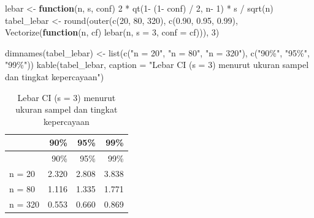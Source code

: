 \documentclass[
  indonesian,
  letterpaper,
]{book}
\newenvironment{Shaded}{\begin{snugshade}}{\end{snugshade}}
\newcommand{\AttributeTok}[1]{\textcolor[rgb]{0.40,0.45,0.13}{#1}}
\newcommand{\ControlFlowTok}[1]{\textcolor[rgb]{0.00,0.23,0.31}{\textbf{#1}}}
\newcommand{\DecValTok}[1]{\textcolor[rgb]{0.68,0.00,0.00}{#1}}
\newcommand{\FloatTok}[1]{\textcolor[rgb]{0.68,0.00,0.00}{#1}}
\newcommand{\FunctionTok}[1]{\textcolor[rgb]{0.28,0.35,0.67}{#1}}
\newcommand{\NormalTok}[1]{\textcolor[rgb]{0.00,0.23,0.31}{#1}}
\newcommand{\OtherTok}[1]{\textcolor[rgb]{0.00,0.23,0.31}{#1}}
\newcommand{\SpecialCharTok}[1]{\textcolor[rgb]{0.37,0.37,0.37}{#1}}
\newcommand{\StringTok}[1]{\textcolor[rgb]{0.13,0.47,0.30}{#1}}
\begin{document}
\begin{Shaded}
\begin{Highlighting}[]
\NormalTok{lebar }\OtherTok{\textless{}{-}} \ControlFlowTok{function}\NormalTok{(n, s, conf) }\DecValTok{2} \SpecialCharTok{*} \FunctionTok{qt}\NormalTok{(}\DecValTok{1}\SpecialCharTok{{-}}\NormalTok{ (}\DecValTok{1}\SpecialCharTok{{-}}\NormalTok{ conf) }\SpecialCharTok{/} \DecValTok{2}\NormalTok{, n}\SpecialCharTok{{-}} \DecValTok{1}\NormalTok{) }\SpecialCharTok{*}\NormalTok{ s }\SpecialCharTok{/} \FunctionTok{sqrt}\NormalTok{(n)}
\NormalTok{tabel\_lebar }\OtherTok{\textless{}{-}} \FunctionTok{round}\NormalTok{(}\FunctionTok{outer}\NormalTok{(}\FunctionTok{c}\NormalTok{(}\DecValTok{20}\NormalTok{, }\DecValTok{80}\NormalTok{, }\DecValTok{320}\NormalTok{), }\FunctionTok{c}\NormalTok{(}\FloatTok{0.90}\NormalTok{, }\FloatTok{0.95}\NormalTok{, }\FloatTok{0.99}\NormalTok{),}
\FunctionTok{Vectorize}\NormalTok{(}\ControlFlowTok{function}\NormalTok{(n, cf) }\FunctionTok{lebar}\NormalTok{(n, }\AttributeTok{s =} \DecValTok{3}\NormalTok{, }\AttributeTok{conf =}\NormalTok{ cf))),}
\DecValTok{3}\NormalTok{)}

\FunctionTok{dimnames}\NormalTok{(tabel\_lebar) }\OtherTok{\textless{}{-}} \FunctionTok{list}\NormalTok{(}\FunctionTok{c}\NormalTok{(}\StringTok{"n = 20"}\NormalTok{, }\StringTok{"n = 80"}\NormalTok{, }\StringTok{"n = 320"}\NormalTok{), }\FunctionTok{c}\NormalTok{(}\StringTok{"90\%"}\NormalTok{, }\StringTok{"95\%"}\NormalTok{,}
\StringTok{"99\%"}\NormalTok{))}
\FunctionTok{kable}\NormalTok{(tabel\_lebar, }\AttributeTok{caption =} \StringTok{"Lebar CI (s = 3) menurut ukuran sampel dan tingkat}
\StringTok{kepercayaan"}\NormalTok{)}
\end{Highlighting}
\end{Shaded}

\begin{longtable}[]{@{}lrrr@{}}
\caption{Lebar CI (s = 3) menurut ukuran sampel dan tingkat
kepercayaan}\tabularnewline
\toprule\noalign{}
& 90\% & 95\% & 99\% \\
\midrule\noalign{}
\endfirsthead
\toprule\noalign{}
& 90\% & 95\% & 99\% \\
\midrule\noalign{}
\endhead
\bottomrule\noalign{}
\endlastfoot
n = 20 & 2.320 & 2.808 & 3.838 \\
n = 80 & 1.116 & 1.335 & 1.771 \\
n = 320 & 0.553 & 0.660 & 0.869 \\
\end{longtable}
\end{document}
